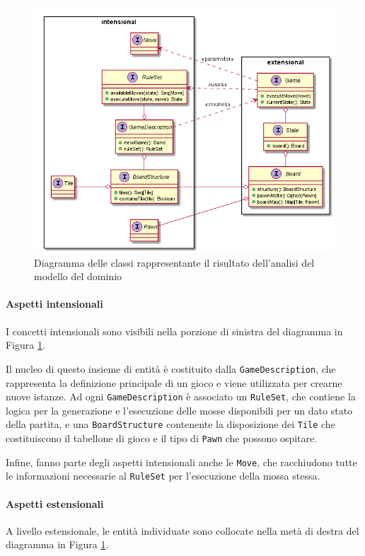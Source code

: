 \begin{figure}
  \centering
  \includegraphics[width=\linewidth]{images/uml/domain_analysis.png}
  \caption{Diagramma delle classi rappresentante il risultato dell'analisi del modello del dominio}
  \label{fig:domain_analysis}
\end{figure}

\paragraph{Aspetti intensionali}
I concetti intensionali sono visibili nella porzione di sinistra del diagramma in Figura \ref{fig:domain_analysis}.

Il nucleo di questo insieme di entità è costituito dalla \texttt{GameDescription}, che rappresenta la definizione principale di un gioco e viene utilizzata per crearne nuove istanze.
%
Ad ogni \texttt{GameDescription} è associato un \texttt{RuleSet}, che contiene la logica per la generazione e l'esecuzione delle mosse disponibili per un dato stato della partita, e una \texttt{BoardStructure} contenente la disposizione dei \texttt{Tile} che costituiscono il tabellone di gioco e il tipo di \texttt{Pawn} che possono ospitare.

Infine, fanno parte degli aspetti intensionali anche le \texttt{Move}, che racchiudono tutte le informazioni necessarie al \texttt{RuleSet} per l'esecuzione della mossa stessa.

\paragraph{Aspetti estensionali}
A livello estensionale, le entità individuate sono collocate nella metà di destra del diagramma in Figura \ref{fig:domain_analysis}.

